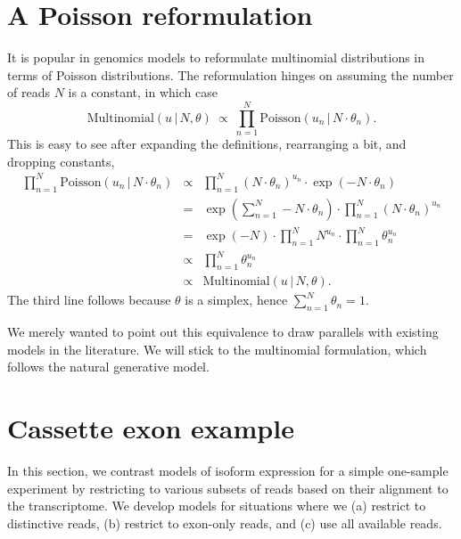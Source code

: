 \documentclass[11pt]{report}
\newcommand{\distro}[3]{\textrm{#1}\!\left( #2 \,|\, #3\right)}
\begin{document}
\section{A Poisson reformulation}

It is popular in genomics models to reformulate multinomial
distributions in terms of Poisson distributions.  The reformulation
hinges on assuming the number of reads $N$ is a constant, in which case
\[
  \textstyle
  \distro{Multinomial}{u}{N, \theta}
  \ \propto \
  \prod_{n=1}^N \distro{Poisson}{u_n}{N \cdot \theta_n}.
\]
This is easy to see after expanding the definitions, rearranging a
bit, and dropping constants,
\begin{eqnarray*}
  \textstyle \prod_{n=1}^N \distro{Poisson}{u_n}{N \cdot \theta_n}
  & \propto & \textstyle \prod_{n=1}^N (N \cdot \theta_n)^{u_n}
              \cdot \exp(-N \cdot \theta_n)
  \\[4pt]
  & = & \textstyle \exp\!\left( \sum_{n=1}^N -N \cdot \theta_n \right)
        \cdot \prod_{n=1}^N (N \cdot \theta_n)^{u_n}
  \\[4pt]
  & = & \textstyle \exp(-N) \cdot \prod_{n=1}^N N^{u_n} \cdot \prod_{n=1}^N \theta_n^{u_n}
  \\[4pt]
  & \propto & \textstyle \prod_{n=1}^N \theta_n^{u_n}
  \\[4pt]
  & \propto & \distro{Multinomial}{u}{N, \theta}.
\end{eqnarray*}
The third line follows because $\theta$ is a simplex, hence $\sum_{n=1}^N
\theta_n = 1$.

We merely wanted to point out this equivalence to draw parallels with
existing models in the literature.  We will stick to the multinomial
formulation, which follows the natural generative model.
  
\section{Cassette exon example}

In this section, we contrast models of isoform expression for a simple
one-sample experiment by restricting to various subsets of reads based
on their alignment to the transcriptome.  We develop models for
situations where we (a) restrict to distinctive reads, (b) restrict to
exon-only reads, and (c) use all available reads.
\end{document}

